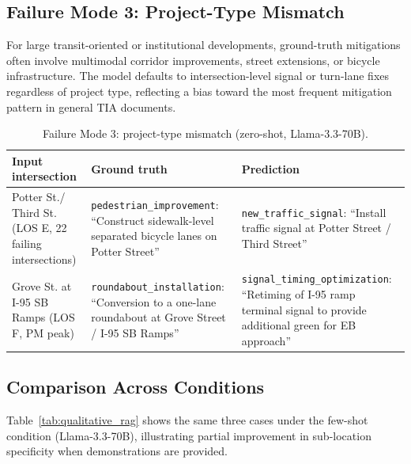 \documentclass[preprint,12pt]{elsarticle}
\begin{document}
\subsection*{Failure Mode 3: Project-Type Mismatch}

For large transit-oriented or institutional developments, ground-truth
mitigations often involve multimodal corridor improvements, street extensions,
or bicycle infrastructure.
The model defaults to intersection-level signal or turn-lane fixes regardless
of project type, reflecting a bias toward the most frequent mitigation pattern
in general TIA documents.

\begin{table}[h]
\centering
\caption{Failure Mode 3: project-type mismatch (zero-shot, Llama-3.3-70B).}
\begin{tabular}{p{3.0cm}p{4.2cm}p{4.2cm}}
\toprule
Input intersection & Ground truth & Prediction \\
\midrule
Potter St./ Third St. (LOS E, 22 failing intersections) &
\texttt{pedestrian\_improvement}: ``Construct sidewalk-level separated bicycle lanes on Potter Street'' &
\texttt{new\_traffic\_signal}: ``Install traffic signal at Potter Street / Third Street'' \\
\addlinespace
Grove St. at I-95 SB Ramps (LOS F, PM peak) &
\texttt{roundabout\_installation}: ``Conversion to a one-lane roundabout at Grove Street / I-95 SB Ramps'' &
\texttt{signal\_timing\_optimization}: ``Retiming of I-95 ramp terminal signal to provide additional green for EB approach'' \\
\bottomrule
\end{tabular}
\end{table}

\subsection*{Comparison Across Conditions}

Table~\ref{tab:qualitative_rag} shows the same three cases under the few-shot
condition (Llama-3.3-70B), illustrating partial improvement in sub-location
specificity when demonstrations are provided.
\end{document}
